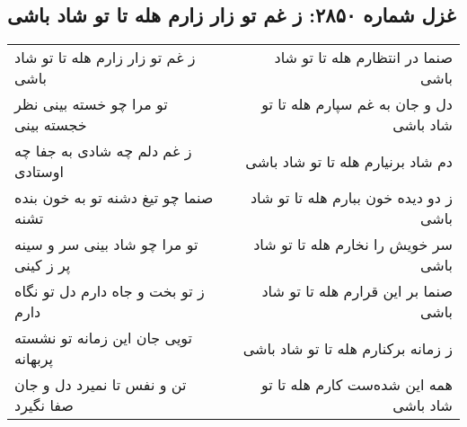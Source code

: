 \begin{center}
\section*{غزل شماره ۲۸۵۰: ز غم تو زار زارم هله تا تو شاد باشی}
\label{sec:2850}
\begin{longtable}{l p{0.5cm} r}
ز غم تو زار زارم هله تا تو شاد باشی
&&
صنما در انتظارم هله تا تو شاد باشی
\\
تو مرا چو خسته بینی نظر خجسته بینی
&&
دل و جان به غم سپارم هله تا تو شاد باشی
\\
ز غم دلم چه شادی به جفا چه اوستادی
&&
دم شاد برنیارم هله تا تو شاد باشی
\\
صنما چو تیغ دشنه تو به خون بنده تشنه
&&
ز دو دیده خون ببارم هله تا تو شاد باشی
\\
تو مرا چو شاد بینی سر و سینه پر ز کینی
&&
سر خویش را نخارم هله تا تو شاد باشی
\\
ز تو بخت و جاه دارم دل تو نگاه دارم
&&
صنما بر این قرارم هله تا تو شاد باشی
\\
تویی جان این زمانه تو نشسته پربهانه
&&
ز زمانه برکنارم هله تا تو شاد باشی
\\
تن و نفس تا نمیرد دل و جان صفا نگیرد
&&
همه این شده‌ست کارم هله تا تو شاد باشی
\\
\end{longtable}
\end{center}
